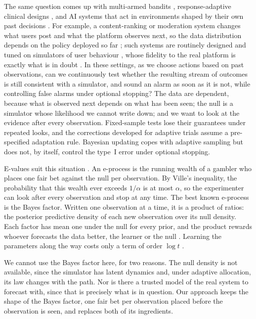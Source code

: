 \documentclass[11pt]{article}
\theoremstyle{remark}
\begin{document}
The same question comes up with multi-armed bandits
\citep{lattimore2020bandit}, response-adaptive clinical designs
\citep{trippa2012bayesian,villar2015multi}, and AI systems that act in
environments shaped by their own past decisions
\citep{perdomo2020performative,dulacarnold2021challenges}. For example, a
content-ranking or moderation system changes what users post and what the
platform observes next, so the data distribution depends on the policy
deployed so far \citep{chaney2018algorithmic,jiang2019degenerate}; such
systems are routinely designed and tuned on simulators of user behaviour
\citep{ie2019recsim,shi2019virtual}, whose fidelity to the real platform is
exactly what is in doubt \citep{zhao2020sim}. In these settings, as we choose
actions based on past observations, can we continuously test whether the
resulting stream of outcomes is still consistent with a simulator, and sound
an alarm as soon as it is not, while controlling false alarms under optional
stopping? The data are dependent, because what is observed next depends on
what has been seen; the null is a simulator whose likelihood we
cannot write down; and we want to look at the evidence after
every observation. Fixed-sample tests lose
their guarantees under repeated looks, and the corrections developed for
adaptive trials \citep{bowden2017unbiased,magirr2012generalized} assume a
pre-specified adaptation rule. Bayesian updating copes with adaptive sampling
but does not, by itself, control the type~I error under optional stopping.

E-values suit this situation
\citep{vovk2021evalues,ramdas2023game,grunwald2024safe}. An e-process is the
running wealth of a gambler who places one fair bet against the null per
observation. By Ville's inequality, the probability that this wealth ever
exceeds $1/\alpha$ is at most $\alpha$, so the experimenter can look after
every observation and stop at any time. The best known e-process is the Bayes
factor. Written one observation at a time, it is a product of ratios: the
posterior predictive density of each new observation over its null density.
Each factor has mean one under the null for every prior, and the product
rewards whoever forecasts the data better, the learner or the null
\citep{dawid1984present}. Learning the parameters along the way costs only a
term of order $\log t$ \citep{clarke1990information}.

We cannot use the Bayes factor here, for two reasons. The null density is not
available, since the simulator has latent dynamics and, under adaptive
allocation, its law changes with the path. Nor is there a trusted model of the
real system to forecast with, since that is precisely what is in question.
Our approach keeps the shape of the Bayes factor, one fair bet per
observation placed before the observation is seen, and replaces both of its
ingredients.
\end{document}
